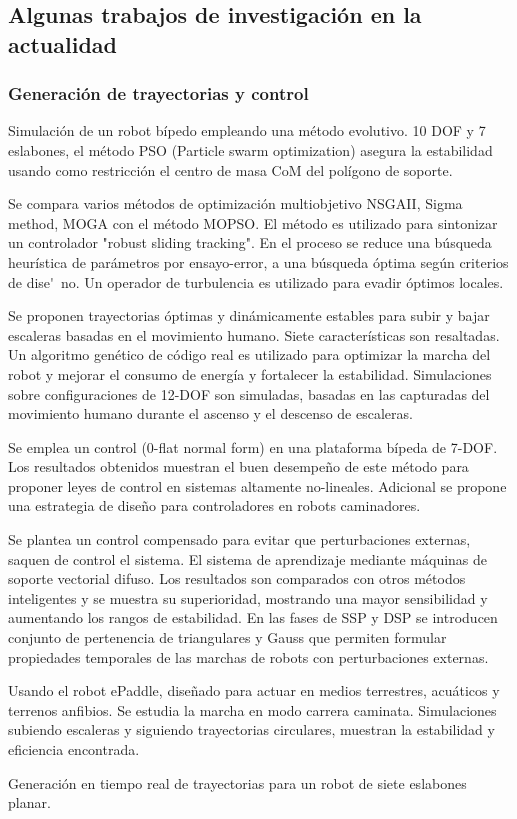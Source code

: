 \subsection[Investigaci\'on actual]{Algunas trabajos de investigaci\'on en la actualidad }
\label{sec:algtra}

\subsubsection[Gen. Tray. y Control]{Generaci\'on de trayectorias y control}
\label{sec:gentray}
Simulaci\'on de un robot b\'ipedo empleando una m\'etodo evolutivo. 10 DOF y 7 eslabones, el m\'etodo PSO (Particle swarm optimization) asegura la estabilidad usando como restricci\'on el centro de masa CoM del pol\'igono de soporte\cite{Kherici2014}.\par
Se compara varios m\'etodos de optimizaci\'on multiobjetivo NSGAII, Sigma method, MOGA con el m\'etodo MOPSO. El m\'etodo es utilizado para sintonizar un controlador "robust sliding tracking". En el proceso se reduce una b\'usqueda heur\'istica de parámetros por ensayo-error, a una b\'usqueda \'optima seg\'un criterios de dise\'~no. Un operador de turbulencia es utilizado para evadir \'optimos locales\cite{Mahmoodabadi2014}.\par
Se proponen trayectorias \'optimas y din\'amicamente estables para subir y bajar escaleras basadas en el movimiento humano. Siete caracter\'isticas son resaltadas. Un algoritmo gen\'etico de c\'odigo real es utilizado para optimizar la marcha del robot y mejorar el consumo de energ\'ia y fortalecer la estabilidad. Simulaciones sobre configuraciones de 12-DOF son simuladas, basadas en las capturadas del movimiento humano durante el ascenso y el descenso de escaleras\cite{Lim2014}.\par
Se emplea un control (0-flat normal form) en una plataforma b\'ipeda de 7-DOF. Los resultados obtenidos muestran el buen desempe\~no de este m\'etodo para proponer leyes de control en sistemas altamente no-lineales. Adicional se propone una estrategia de dise\~no para controladores en robots caminadores\cite{Bououden2014}.\par
Se plantea un control compensado para evitar que perturbaciones externas, saquen de control el sistema. El sistema de aprendizaje mediante m\'aquinas de soporte vectorial difuso. Los resultados son comparados con otros m\'etodos inteligentes y se muestra su superioridad, mostrando una mayor sensibilidad y aumentando los rangos de estabilidad. En las fases de SSP y DSP se introducen conjunto de pertenencia de  triangulares y Gauss que permiten formular propiedades temporales de las marchas de robots con perturbaciones externas\cite{Wang2013}.\par
Usando el robot ePaddle, dise\~nado para actuar en medios terrestres, acu\'aticos y terrenos anfibios. Se estudia la marcha en modo carrera caminata. Simulaciones subiendo escaleras y siguiendo trayectorias circulares, muestran la estabilidad y eficiencia encontrada\cite{Sun2013}.\par
Generaci\'on en tiempo real de trayectorias para un robot de siete eslabones planar\cite{Farzaneh2014}.\par

